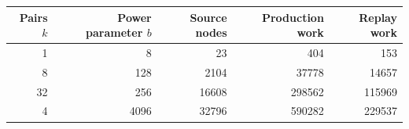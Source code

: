 \begin{center}\small
\begin{tabular}{rrrrr}
\toprule
Pairs $k$ & Power parameter $b$ & Source nodes & Production work & Replay work \\
\midrule
1 & 8 & 23 & 404 & 153 \\
8 & 128 & 2104 & 37778 & 14657 \\
32 & 256 & 16608 & 298562 & 115969 \\
4 & 4096 & 32796 & 590282 & 229537 \\
\bottomrule
\end{tabular}
\end{center}

